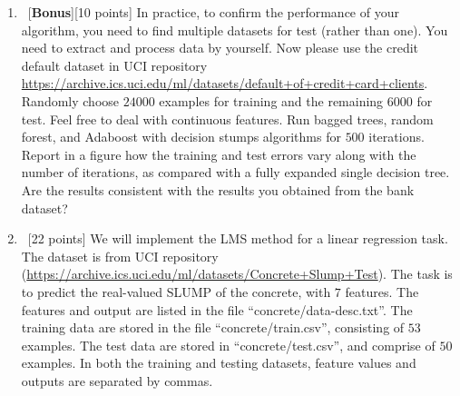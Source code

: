 \documentclass[12pt, fullpage,letterpaper]{article}
\begin{document}
\begin{enumerate}
\item~[\textbf{Bonus}][10 points] In practice, to confirm the performance of your algorithm, you need to find multiple datasets for test (rather than one). You need to extract and process data by yourself. Now please use the credit default dataset in UCI repository \href{https://archive.ics.uci.edu/ml/datasets/default+of+credit+card+clients}{https://archive.ics.uci.edu/ml/datasets/default+of+credit+card+clients}. Randomly choose $24000$ examples for training and the remaining $6000$ for test. Feel free to deal with continuous features. Run bagged trees, random forest, and Adaboost with decision stumps algorithms for $500$ iterations. Report in a figure how the training and test errors vary along with the number of iterations, as compared with a fully expanded single decision tree. Are the results consistent with the results you obtained from the bank dataset?

	\item~[22 points] We will implement the LMS method for a linear regression task. The dataset is from UCI repository (\url{https://archive.ics.uci.edu/ml/datasets/Concrete+Slump+Test}). The task is to predict the real-valued SLUMP of the concrete, with $7$ features. The features and output are listed in the file ``concrete/data-desc.txt''. The training data are stored in the file ``concrete/train.csv'', consisting of $53$ examples. The test data are stored in ``concrete/test.csv'', and comprise of $50$ examples. In both the training and testing datasets, feature values and outputs are separated by commas. 
	

\end{enumerate}
\end{document}
